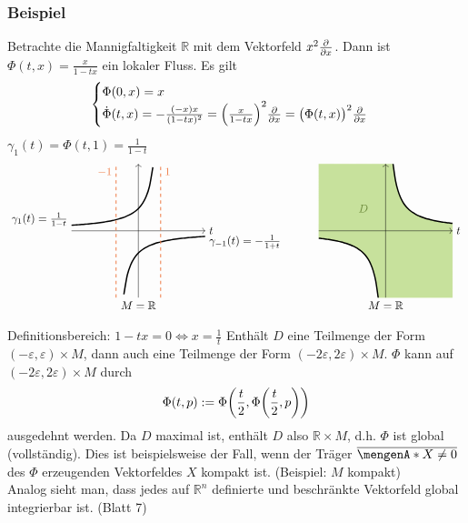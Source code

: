 \subsubsection[Beispiel: Lokaler Fluss in $\mathds{R}$]{Beispiel} %
\label{ssub:259}
Betrachte die Mannigfaltigkeit $\mathds{R}$ mit dem Vektorfeld $x^2 \frac{{\partial }}{{\partial x}} $. Dann ist $\Phi (t,x) = \frac{x}{1- tx}$ ein lokaler Fluss. Es gilt
\[
	\begin{cases}
		\Phi (0,x) = x \\
		\dot{\Phi}(t,x) = - \frac{(-x) x}{(1-tx)^2} = \enbrace*{\frac{x}{1-tx} }^2 \diff{}{x} = \enbrace[\big]{\Phi(t,x)}^2 \diff{}{x}     
	\end{cases}
\]
$\gamma_1(t)= \Phi(t,1)= \frac{1}{1-t} $
\[
	\begin{tikzpicture}[scale=0.7]
		\draw[->] (-3,0) -- (3,0) node[right]{$t$};
		\draw[->] (0,-3) node[below]{$M=\mathds{R}$} -- (0,3);
		\draw[variable=\t, domain=-3:0.65, very thick, smooth] plot ({\t}, {1 /(1-\t)});
		\draw[variable=\t, domain=-0.65:3, very thick, smooth] plot ({\t}, {-1 /(1+\t)});
		\node[left] at (-3,0.5) {$\gamma_1(t)= \frac{1}{1-t} $};
		\node[right] at(3,-0.5) {$\gamma_{-1}(t)= -\frac{1}{1+t}$};
		\draw[dashed, Sienna2, thick] (-1,-3) -- (-1,3) node[below left]{$-1$};
		\draw[dashed, Sienna2, thick] (1,-3) -- (1,3) node[below right]{$1$};
	\end{tikzpicture} \qquad \quad 
	\begin{tikzpicture}[scale=0.7]
		\draw[variable=\t, very thin, fill, DarkOliveGreen3!60, smooth] plot[domain=0.333:3] (\t, 1/\t) -- (3,-3) -- plot[domain=-0.333:-3] (\t, 1/\t) -- (-3,3) -- cycle;
		\draw[variable=\t, very thick, smooth] plot[domain=0.333:3] (\t, 1/\t)  plot[domain=-0.333:-3] (\t, 1/\t) ;
		\draw[->] (-3,0) -- (3,0) node[right]{$t$};
		\draw[->] (0,-3) node[below]{$M=\mathds{R}$} -- (0,3);
		\node[DarkOliveGreen4] at (-1,1) {$D$};
	\end{tikzpicture}
\]
Definitionsbereich: $1-tx = 0 \Leftrightarrow x = \frac{1}{t}$ 
Enthält $D$ eine Teilmenge der Form $(-\varepsilon, \varepsilon) \times M$, dann auch eine Teilmenge der Form $(-2 \varepsilon, 2 \varepsilon) \times M$.
$\Phi $ kann auf $(-2 \varepsilon, 2 \varepsilon) \times M$ durch
\[
	\Phi(t,p) := \Phi \enbrace*{\frac{t}{2}, \Phi \enbrace*{\frac{t}{2}, p }  } 
\]
ausgedehnt werden. Da $D$ maximal ist, enthält $D$ also $\mathds{R} \times M$, d.h. $\Phi $ ist global (vollständig). Dies ist beispielsweise der Fall, wenn der Träger 
$\overline{\set{X \not= 0}}$ des $\Phi$ erzeugenden Vektorfeldes $X$ kompakt ist. (Beispiel: $M$ kompakt) \\
Analog sieht man, dass jedes auf $\mathds{R}^n$ definierte und beschränkte Vektorfeld global integrierbar ist. (Blatt 7)

